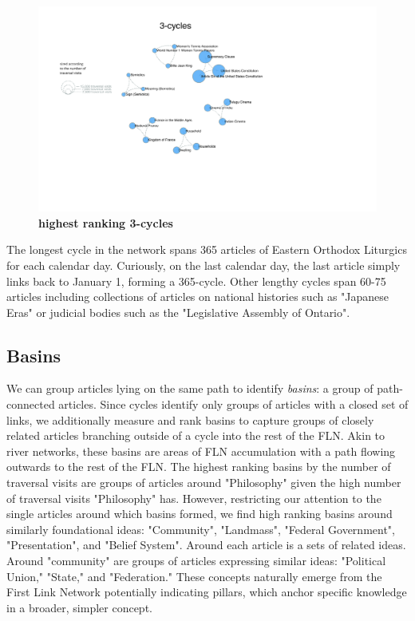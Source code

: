 \documentclass[pre,twocolumn,twoside,superscriptaddress,floatfix, aps, 10pt]{revtex4-1}
\begin{document}
\begin{figure}[tp!]
  \centering	
  \includegraphics[width=\textwidth]{graphics/3_cycles.pdf}
  \caption{
    \textbf{highest ranking 3-cycles}
  }
  \label{fig:3-cycles}
\end{figure}

The longest cycle in the network spans 365 articles of Eastern Orthodox Liturgics for each calendar day. 
Curiously, on the last calendar day, the last article simply links back to January 1, forming a 365-cycle.
Other lengthy cycles span 60-75 articles including collections of articles on national histories such as "Japanese Eras" 
or judicial bodies such as the "Legislative Assembly of Ontario".





\subsection{Basins}

We can group articles lying on the same path to identify {\it basins}: 
a group of path-connected articles.
Since cycles identify only groups of articles with a closed set of links, 
we additionally measure and rank basins to capture groups of closely related
articles branching outside of a cycle into the rest of the FLN.
Akin to river networks, these basins are areas of FLN accumulation with a path 
flowing outwards to the rest of the FLN.
The highest ranking basins by the number of traversal visits are groups of articles
around "Philosophy" given the high number of traversal visits "Philosophy" has. 
However, restricting our attention to the 
 single articles around which basins formed,
 we find high ranking basins around similarly foundational ideas:
"Community", "Landmass", "Federal Government", "Presentation", and "Belief System". 
Around each article is a sets of related ideas. Around "community" are groups of articles expressing similar ideas: "Political Union," "State," and "Federation." 
These concepts naturally emerge from the First Link Network potentially indicating pillars, which 
anchor specific knowledge in a broader, simpler concept.
\end{document}
